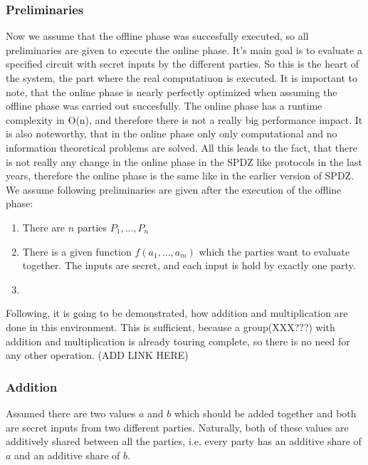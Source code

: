 \documentclass[english,runningheads,a4paper]{llncs}[2018/03/10]
\begin{document}
\subsubsection{Preliminaries}


Now we assume that the offline phase was succesfully executed, so all preliminaries are given to execute the online phase. It's main goal is to evaluate a specified circuit with secret inputs by the different parties. So this is the heart of the system, the part where the real computatiuon is executed. 
It is important to note, that the online phase is nearly perfectly optimized when assuming the offline phase was carried out succesfully. The online phase has a runtime complexity in O(n), and therefore there is not a really big performance impact. It is also noteworthy, that in the online phase only only computational and no information theoretical problems are solved. All this leads to the fact, that there is not really any change in the online phase in the SPDZ like protocols in the last years, therefore the online phase is the same like in the earlier version of SPDZ.\\


We assume following preliminaries are given after the execution of the offline phase:\\
\begin{enumerate}
\item There are \(n\) parties \(P_1,...,P_n\)
\item There is a given function \(f(a_1,...,a_m)\) which the parties want to evaluate together. The inputs are secret, and each input is hold by exactly one party.
\item 

\end{enumerate}

Following, it is going to be demonstrated, how addition and multiplication are done in this environment. This is sufficient, because a group(XXX???) with addition and multiplication is already touring complete, so there is no need for any other operation. (ADD LINK HERE)\\



\subsubsection{Addition}
Assumed there are two values \( a\) and \( b\) which should be added together and both are secret inputs from two different parties. Naturally, both of these values are additively shared between all the parties, i.e. every party has an additive share of \( a\) and an additive share of \( b\). 
\end{document}
